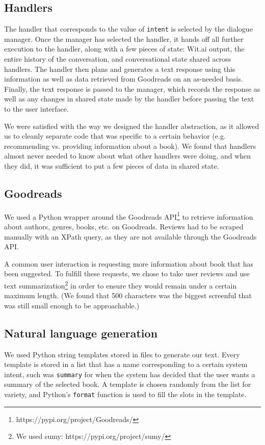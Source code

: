 \documentclass[11pt,a4paper]{article}
\begin{document}
\subsection{Handlers}

The handler that corresponds to the value of {\tt intent} is selected by the dialogue manager. Once the manager has selected the handler, it hands off all further execution to the handler, along with a few pieces of state: Wit.ai output, the entire history of the conversation, and conversational state shared across handlers. The handler then plans and generates a text response using this information as well as data retrieved from Goodreads on an as-needed basis. Finally, the text response is passed to the manager, which records the response as well as any changes in shared state made by the handler before passing the text to the user interface.  

We were satisfied with the way we designed the handler abstraction, as it allowed us to cleanly separate code that was specific to a certain behavior (e.g. recommending vs. providing information about a book). We found that handlers almost never needed to know about what other handlers were doing, and when they did, it was sufficient to put a few pieces of data in shared state.

\subsection{Goodreads}

We used a Python wrapper around the Goodreads API\footnote{{https://pypi.org/project/Goodreads/}} to retrieve information about authors, genres, books, etc. on Goodreads. Reviews had to be scraped manually with an XPath query, as they are not available through the Goodreads API.

A common user interaction is requesting more information about book that has been suggested. To fulfill these requests, we chose to take user reviews and use text summarization\footnote{We used sumy: {https://pypi.org/project/sumy/}} in order to ensure they would remain under a certain maximum length. (We found that 500 characters was the biggest screenful that was still small enough to be approachable.)

\subsection{Natural language generation}

We used Python string templates stored in files to generate our text. Every template is stored in a list that has a name corresponding to a certain system intent, such was {\tt summary} for when the system has decided that the user wants a summary of the selected book. A template is chosen randomly from the list for variety, and Python's {\tt format} function is used to fill the slots in the template.
\end{document}
